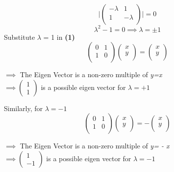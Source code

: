 \documentclass[a4paper, 12pt]{article}
\begin{document}
\begin{flushleft}
    \[\bigg|\begin{pmatrix}
        -\lambda & 1  \\
        1 & -\lambda  \\
    \end{pmatrix} \bigg| = 0 \]
    \[\lambda^{2} - 1 = 0 \implies \lambda = \pm 1\]
    Substitute $\lambda$ = 1 in \textbf{(1)}
    \[\begin{pmatrix}
        0 & 1  \\
        1 & 0  \\
    \end{pmatrix} \begin{pmatrix}
        x  \\
        y  \\
    \end{pmatrix} = \begin{pmatrix}
        x  \\
        y  \\
    \end{pmatrix}\]
    \begin{center}
        $\implies$ The Eigen Vector is a non-zero multiple of \emph{y=x}\\
    $\implies \begin{pmatrix}
        1 \\
        1
    \end{pmatrix}$ is a possible eigen vector for $\lambda = +1$
    \end{center}
    Similarly, for $\lambda = -1$
    \[\begin{pmatrix}
        0 & 1  \\
        1 & 0  \\
    \end{pmatrix} \begin{pmatrix}
        x  \\
        y  \\
    \end{pmatrix} = -\begin{pmatrix}
        x  \\
        y  \\
    \end{pmatrix}\]
    \begin{center}
        $\implies$ The Eigen Vector is a non-zero multiple of \emph{y= - x}\\
    $\implies \begin{pmatrix}
        1 \\
        -1
    \end{pmatrix}$ is a possible eigen vector for $\lambda = -1$

\end{center}
\end{flushleft}
\end{document}
